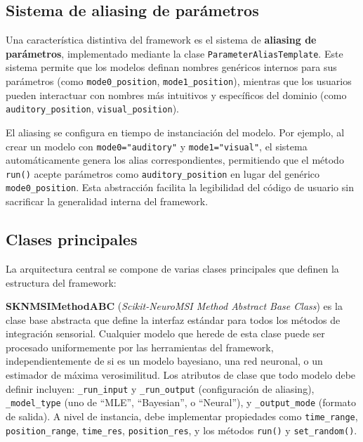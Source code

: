 \subsection{Sistema de aliasing de parámetros}
\label{subsec:snmsi_aliasing}

Una característica distintiva del framework es el sistema de \textbf{aliasing de parámetros}, implementado mediante la clase \texttt{ParameterAliasTemplate}. Este sistema permite que los modelos definan nombres genéricos internos para sus parámetros (como \texttt{mode0\_position}, \texttt{mode1\_position}), mientras que los usuarios pueden interactuar con nombres más intuitivos y específicos del dominio (como \texttt{auditory\_position}, \texttt{visual\_position}).

El aliasing se configura en tiempo de instanciación del modelo. Por ejemplo, al crear un modelo con \texttt{mode0="auditory"} y \texttt{mode1="visual"}, el sistema automáticamente genera los alias correspondientes, permitiendo que el método \texttt{run()} acepte parámetros como \texttt{auditory\_position} en lugar del genérico \texttt{mode0\_position}. Esta abstracción facilita la legibilidad del código de usuario sin sacrificar la generalidad interna del framework.

\subsection{Clases principales}
\label{subsec:snmsi_clases}

La arquitectura central se compone de varias clases principales que definen la estructura del framework:

\textbf{SKNMSIMethodABC} (\textit{Scikit-NeuroMSI Method Abstract Base Class}) es la clase base abstracta que define la interfaz estándar para todos los métodos de integración sensorial. Cualquier modelo que herede de esta clase puede ser procesado uniformemente por las herramientas del framework, independientemente de si es un modelo bayesiano, una red neuronal, o un estimador de máxima verosimilitud. Los atributos de clase que todo modelo debe definir incluyen: \texttt{\_run\_input} y \texttt{\_run\_output} (configuración de aliasing), \texttt{\_model\_type} (uno de ``MLE'', ``Bayesian'', o ``Neural''), y \texttt{\_output\_mode} (formato de salida). A nivel de instancia, debe implementar propiedades como \texttt{time\_range}, \texttt{position\_range}, \texttt{time\_res}, \texttt{position\_res}, y los métodos \texttt{run()} y \texttt{set\_random()}.

